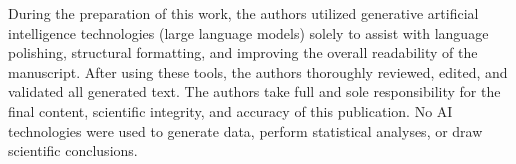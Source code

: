During the preparation of this work, the authors utilized generative artificial intelligence technologies (large
language models) solely to assist with language polishing, structural formatting, and improving the overall
readability of the manuscript. After using these tools, the authors thoroughly reviewed, edited, and validated all
generated text. The authors take full and sole responsibility for the final content, scientific integrity, and
accuracy of this publication. No AI technologies were used to generate data, perform statistical analyses, or draw
scientific conclusions.
